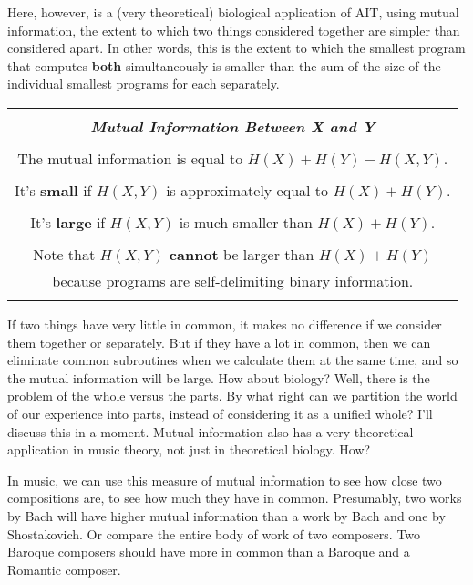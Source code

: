 \documentclass[12pt]{book}
\begin{document}
Here, however, is a (very theoretical) biological application of AIT, using mutual information,
the extent to which two things considered together are simpler than considered apart.
In other words,
this is the extent to which the smallest program that computes \textbf{both} simultaneously 
is smaller than the sum of the size of the individual smallest programs for each separately.
 
\begin{center}
\begin{tabular}{|c|}
\hline
\\
\textbf{\large \emph{Mutual Information Between X and Y}}
\\ \\
The mutual information is equal to $H(X) + H(Y) - H(X, Y)$.
\\ \\
It's \textbf{small} if 
$H(X, Y)$ is approximately equal to $H(X) + H(Y)$.
\\ \\
It's \textbf{large} if 
$H(X, Y)$ is much smaller than $H(X) + H(Y)$.
\\ \\
Note that $H(X, Y)$ \textbf{cannot} be larger than $H(X) + H(Y)$
\\
because programs are self-delimiting binary information.
\\
\\
\hline
\end{tabular}
\end{center}
 
If two things have very little in common, it makes no difference if we consider them together
or separately.  But if they have a lot in common, then we can eliminate common subroutines
when we calculate them at the same time, and so the mutual information will be large.
How about biology?  Well, there is the problem of the whole versus the parts.  By what right
can we partition the world of our experience into parts, instead of considering it as a unified whole?
I'll discuss this in a moment.
Mutual information also has a very theoretical application in music theory, 
not just in theoretical biology.
How?
 
In music, we can use this measure of mutual information 
to see how close two compositions are, to see how much they have in common.
Presumably, two works by Bach will have higher mutual information than a work by Bach and
one by Shostakovich. Or compare the entire body of work of two composers.  Two Baroque
composers should have more in common than a Baroque and a Romantic composer.
 
\end{document}
